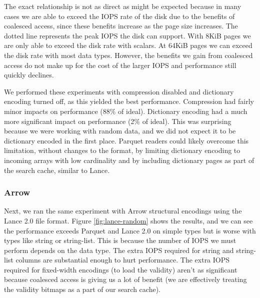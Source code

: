 \documentclass[sigconf, nonacm]{acmart}
\begin{document}
The exact relationship is not as direct as might be expected because in many cases we are able to exceed the IOPS rate of the disk due to the benefits of coalesced access, since these benefits increase as the page size increases.  The dotted line represents the peak IOPS the disk can support.  With 8KiB pages we are only able to exceed the disk rate with scalars.  At 64KiB pages we can exceed the disk rate with most data types.  However, the benefits we gain from coalesced access do not make up for the cost of the larger IOPS and performance still quickly declines.

We performed these experiments with compression disabled and dictionary encoding turned off, as this yielded the best performance.  Compression had fairly minor impacts on performance (88\% of ideal).  Dictionary encoding had a much more significant impact on performance (2\% of ideal).  This was surprising because we were working with random data, and we did not expect it to be dictionary encoded in the first place.  Parquet readers could likely overcome this limitation, without changes to the format, by limiting dictionary encoding to incoming arrays with low cardinality and by including dictionary pages as part of the search cache, similar to Lance.

\subsubsection{Arrow}

Next, we ran the same experiment with Arrow structural encodings using the Lance 2.0 file format.  Figure \ref{fig:lance-random} shows the results, and we can see the performance exceeds Parquet and Lance 2.0 on simple types but is worse with types like string or string-list.  This is because the number of IOPS we must perform depends on the data type.  The extra IOPS required for string and string-list columns are substantial enough to hurt performance.  The extra IOPS required for fixed-width encodings (to load the validity) aren't as significant because coalesced access is giving us a lot of benefit (we are effectively treating the validity bitmaps as a part of our search cache).
\end{document}
